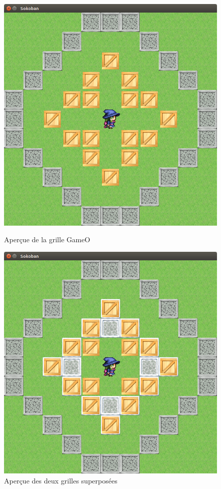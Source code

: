 \documentclass{article}
\begin{document}
\begin{figure}[h]
\begin{center}
\begin{minipage}[b]{0.4\textwidth}
\includegraphics[width=\textwidth]{img/06.png}
\caption{Aperçue de la grille GameO}
\end{minipage}
\begin{minipage}[b]{0.4\textwidth}
\includegraphics[width=\textwidth]{img/05.png}
\caption{Aperçue des deux grilles superposées}
\end{minipage}
\end{center}
\end{figure}
\newpage
\end{document}
